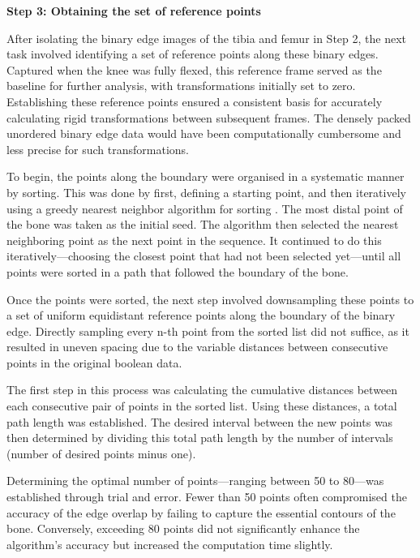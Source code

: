 \documentclass{micro-econ-thesis}
\begin{document}
\textbf{Step 3: Obtaining the set of reference points}

After isolating the binary edge images of the tibia and femur in Step 2, the next task involved identifying a set of reference points along these binary edges. Captured when the knee was fully flexed, this reference frame served as the baseline for further analysis, with transformations initially set to zero.  Establishing these reference points ensured a consistent basis for accurately calculating rigid transformations between subsequent frames. The densely packed unordered binary edge data would have been computationally cumbersome and less precise for such transformations.

To begin, the points along the boundary were organised in a systematic manner by sorting. This was done by first, defining a starting point, and then iteratively using a greedy nearest neighbor algorithm for sorting \parencite{Hinneburg2000neare-5849}. The most distal point of the bone was taken as the initial seed. The algorithm then selected the nearest neighboring point as the next point in the sequence. It continued to do this iteratively—choosing the closest point that had not been selected yet—until all points were sorted in a path that followed the boundary of the bone.

Once the points were sorted, the next step involved downsampling these points to a set of uniform equidistant reference points along the boundary of the binary edge. Directly sampling every n-th point from the sorted list did not suffice, as it resulted in uneven spacing due to the variable distances between consecutive points in the original boolean data.

The first step in this process was calculating the cumulative distances between each consecutive pair of points in the sorted list. Using these distances, a total path length was established. The desired interval between the new points was then determined by dividing this total path length by the number of intervals (number of desired points minus one). 

Determining the optimal number of points—ranging between 50 to 80—was established through trial and error. Fewer than 50 points often compromised the accuracy of the edge overlap by failing to capture the essential contours of the bone. Conversely, exceeding 80 points did not significantly enhance the algorithm's accuracy but increased the computation time slightly. 
\end{document}
